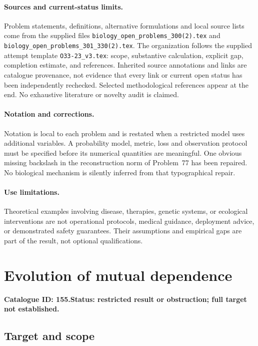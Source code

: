 \documentclass[11pt]{article}
\begin{document}
\paragraph{Sources and current-status limits.}
Problem statements, definitions, alternative formulations and local source lists
come from the supplied files
\texttt{biology\_open\_problems\_300(2).tex} and
\texttt{biology\_open\_problems\_301\_330(2).tex}.
The organization follows the supplied attempt template
\texttt{O33-23\_v3.tex}: scope, substantive calculation, explicit gap,
completion estimate, and references. Inherited source annotations and links are
catalogue provenance, not evidence that every link or current open status has
been independently rechecked. Selected methodological references appear at the
end. No exhaustive literature or novelty audit is claimed.

\paragraph{Notation and corrections.}
Notation is local to each problem and is restated when a restricted model uses
additional variables. A probability model, metric, loss and observation protocol
must be specified before its numerical quantities are meaningful. One obvious
missing backslash in the reconstruction norm of Problem~77 has been repaired.
No biological mechanism is silently inferred from that typographical repair.

\paragraph{Use limitations.}
Theoretical examples involving disease, therapies, genetic systems, or ecological
interventions are not operational protocols, medical guidance, deployment advice,
or demonstrated safety guarantees. Their assumptions and empirical gaps are part
of the result, not optional qualifications.

\setcounter{section}{154}
\section{Evolution of mutual dependence}
\label{prob:155}
\noindent\textbf{Catalogue ID: 155.}\quad \textbf{Status: restricted result or obstruction; full target not established.}
\subsection{Target and scope}
\end{document}
